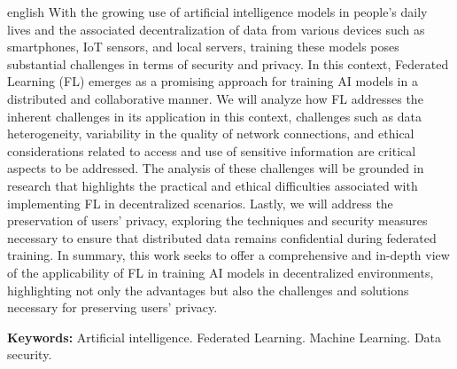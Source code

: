 \begin{resumo}[Abstract]
 \begin{otherlanguage*}{english}
   With the growing use of artificial intelligence models in people's daily lives and the associated decentralization of data from various devices such as smartphones, IoT sensors, and local servers, training these models poses substantial challenges in terms of security and privacy. In this context, Federated Learning (FL) emerges as a promising approach for training AI models in a distributed and collaborative manner. We will analyze how FL addresses the inherent challenges in its application in this context, challenges such as data heterogeneity, variability in the quality of network connections, and ethical considerations related to access and use of sensitive information are critical aspects to be addressed. The analysis of these challenges will be grounded in research that highlights the practical and ethical difficulties associated with implementing FL in decentralized scenarios. Lastly, we will address the preservation of users' privacy, exploring the techniques and security measures necessary to ensure that distributed data remains confidential during federated training. In summary, this work seeks to offer a comprehensive and in-depth view of the applicability of FL in training AI models in decentralized environments, highlighting not only the advantages but also the challenges and solutions necessary for preserving users' privacy.


    \vspace{\onelineskip}
 
    \noindent 
    \textbf{Keywords:} Artificial intelligence. Federated Learning. Machine Learning. Data security.
 \end{otherlanguage*}
\end{resumo}
